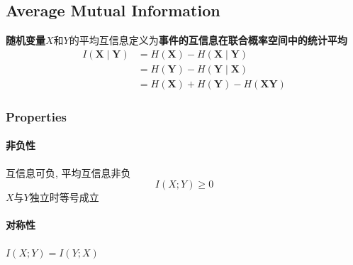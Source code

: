 \documentclass[a4paper]{report}
\begin{document}
\subsection{Average Mutual Information}
\textbf{随机变量}$X$和$Y$的平均互信息定义为\textbf{事件的互信息在联合概率空间中的统计平均}
\begin{align*}
  I(\textbf{X}\mid \textbf{Y})&=H(\textbf{X})-H(\textbf{X}\mid \textbf{Y})
  \\ &=H(\textbf{Y})-H(\textbf{Y}\mid \textbf{X})
  \\ &=H(\textbf{X})+H(\textbf{Y})-H(\textbf{XY})
\end{align*}
\subsubsection{Properties}
\paragraph{非负性}互信息可负, 平均互信息非负$$I(X;Y)\geq 0$$ $X$与$Y$独立时等号成立
\paragraph{对称性} $I(X;Y)=I(Y;X)$
\end{document}
